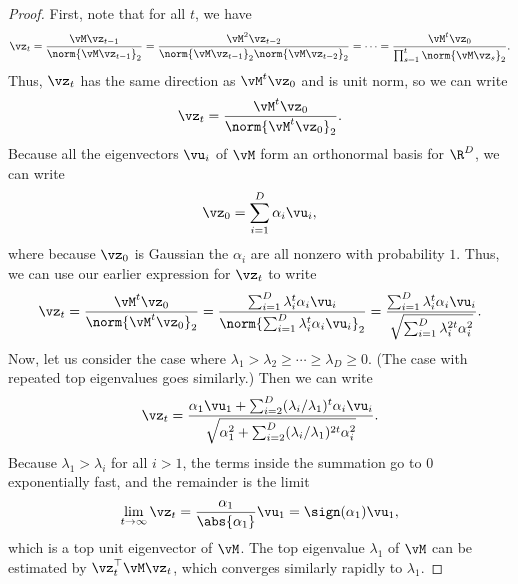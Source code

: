 \documentclass[../../book-main.tex]{subfiles}
\begin{document}
\begin{proof} First, note that for all \(t\), we have
    \begin{equation}
        \vz_{t} = \frac{\vM\vz_{t - 1}}{\norm{\vM\vz_{t - 1}}_{2}} =
        \frac{\vM^{2}\vz_{t - 2}}{\norm{\vM\vz_{t -
        1}}_{2}\norm{\vM\vz_{t - 2}}_{2}} = \cdots =
        \frac{\vM^{t}\vz_{0}}{\prod_{s = 1}^{t}\norm{\vM\vz_{s}}_{2}}.
    \end{equation}
    Thus, \(\vz_{t}\) has the same direction as \(\vM^{t}\vz_{0}\)
    and is unit norm, so we can write
    \begin{equation}
        \vz_{t} = \frac{\vM^{t}\vz_{0}}{\norm{\vM^{t}\vz_{0}}_{2}}.
    \end{equation}
    Because all the eigenvectors \(\vu_{i}\) of $\vM$ form an
    orthonormal basis for \(\R^{D}\), we can write
    \begin{equation}
        \vz_{0} = \sum_{i = 1}^{D}\alpha_{i}\vu_{i},
    \end{equation}
    where because \(\vz_{0}\) is Gaussian the \(\alpha_{i}\) are all
    nonzero with probability \(1\). Thus, we can use our earlier
    expression for \(\vz_{t}\) to write
    \begin{equation}
        \vz_{t} = \frac{\vM^{t}\vz_{0}}{\norm{\vM^{t}\vz_{0}}_{2}} =
        \frac{\sum_{i =
        1}^{D}\lambda_{i}^{t}\alpha_{i}\vu_{i}}{\norm{\sum_{i =
        1}^{D}\lambda_{i}^{t}\alpha_{i}\vu_{i}}_{2}} = \frac{\sum_{i
        = 1}^{D}\lambda_{i}^{t}\alpha_{i}\vu_{i}}{\sqrt{\sum_{i =
        1}^{D}\lambda_{i}^{2t}\alpha_{i}^{2}}}.
    \end{equation}
    Now, let us consider the case where \(\lambda_{1} > \lambda_{2}
    \geq \cdots \geq \lambda_{D} \geq 0\). (The case with repeated
    top eigenvalues goes similarly.) Then we can write
    \begin{equation}
        \vz_{t} = \frac{\alpha_{1}\vu_{1} + \sum_{i =
        2}^{D}(\lambda_{i}/\lambda_{1})^{t}\alpha_{i}\vu_{i}}{\sqrt{\alpha_{1}^{2}
        + \sum_{i = 2}^{D}(\lambda_{i}/\lambda_{1})^{2t}\alpha_{i}^{2}}}.
    \end{equation}
    Because \(\lambda_{1} > \lambda_{i}\) for all \(i > 1\), the
    terms inside the summation go to \(0\) exponentially fast, and
    the remainder is the limit
    \begin{equation}
        \lim_{t \to \infty}\vz_{t} =
        \frac{\alpha_{1}}{\abs{\alpha_{1}}}\vu_{1} = \sign(\alpha_{1})\vu_{1},
    \end{equation}
    which is a top unit eigenvector of \(\vM\). The top eigenvalue
    \(\lambda_{1}\) of \(\vM\) can be estimated by
    \(\vz_{t}^{\top}\vM\vz_{t}\), which converges similarly rapidly
    to \(\lambda_{1}\).
\end{proof}
\end{document}
